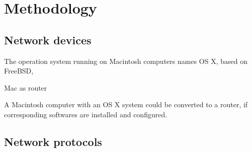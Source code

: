 \newpage
\chapter{Methodology}

\section{Network devices}


The operation system running on Macintosh computers names OS X, based on FreeBSD, 

Mac as router

A Macintosh computer with an OS X system could be converted to a router, if corresponding softwares are installed and configured.



\section{Network protocols}

\section{}